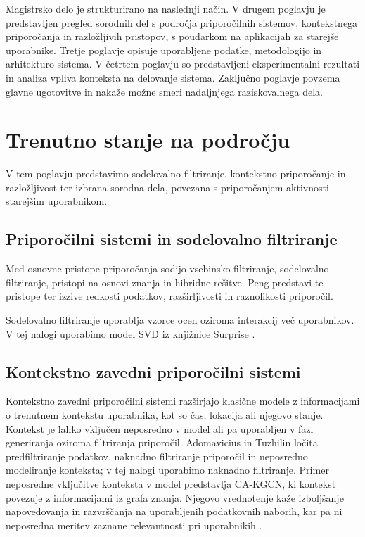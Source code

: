 \documentclass[a4paper,twoside,openright,12pt,slovene]{book}
\begin{document}
Magistrsko delo je strukturirano na naslednji način. V drugem poglavju je
predstavljen pregled sorodnih del s področja priporočilnih sistemov,
kontekstnega priporočanja in razložljivih pristopov, s poudarkom na aplikacijah
za starejše uporabnike. Tretje poglavje opisuje uporabljene podatke,
metodologijo in arhitekturo sistema. V četrtem poglavju so predstavljeni
eksperimentalni rezultati in analiza vpliva konteksta na delovanje sistema.
Zaključno poglavje povzema glavne ugotovitve in nakaže možne smeri nadaljnjega
raziskovalnega dela.




\chapter{Trenutno stanje na področju} 
\label{sec:state_of_the_art}
V tem poglavju predstavimo sodelovalno filtriranje,
kontekstno priporočanje in razložljivost ter izbrana
sorodna dela, povezana s priporočanjem aktivnosti
starejšim uporabnikom. 

\section{Priporočilni sistemi in sodelovalno filtriranje} 
\label{sec:sota_cf}

Med osnovne pristope priporočanja sodijo vsebinsko
filtriranje, sodelovalno filtriranje, pristopi na osnovi
znanja in hibridne rešitve. Peng \cite{peng2022survey}
predstavi te pristope ter izzive redkosti podatkov,
razširljivosti in raznolikosti priporočil.

Sodelovalno filtriranje uporablja vzorce ocen oziroma
interakcij več uporabnikov. V tej nalogi uporabimo
model SVD iz knjižnice Surprise \cite{hug2020surprise}.

\section{Kontekstno zavedni priporočilni sistemi}
\label{sec:sota_context}

Kontekstno zavedni priporočilni sistemi razširjajo klasične modele z informacijami o trenutnem kontekstu uporabnika, kot so čas, lokacija ali njegovo stanje. Kontekst je lahko vključen neposredno v model ali pa uporabljen v fazi generiranja oziroma filtriranja priporočil. Adomavicius in Tuzhilin \cite{adomavicius2011context} ločita predfiltriranje podatkov, naknadno filtriranje priporočil in neposredno modeliranje konteksta; v tej nalogi uporabimo naknadno filtriranje. Primer neposredne vključitve konteksta v model predstavlja
CA-KGCN, ki kontekst povezuje z informacijami iz grafa
znanja. Njegovo vrednotenje kaže izboljšanje napovedovanja
in razvrščanja na uporabljenih podatkovnih naborih,
kar pa ni neposredna meritev zaznane relevantnosti
pri uporabnikih \cite{zhong2023context}.
\end{document}

